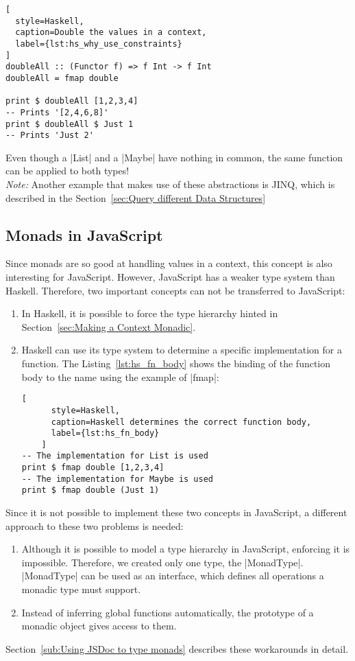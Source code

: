 \begin{lstlisting}[
  style=Haskell,
  caption=Double the values in a context,
  label={lst:hs_why_use_constraints}
]
doubleAll :: (Functor f) => f Int -> f Int
doubleAll = fmap double

print $ doubleAll [1,2,3,4]
-- Prints '[2,4,6,8]'
print $ doubleAll $ Just 1
-- Prints 'Just 2'
\end{lstlisting}

Even though a |List| and a |Maybe| have nothing in common, the same function
can be applied to both types! \\ 
\textit{Note:} Another example that makes use of these abstractions is JINQ,
which is described in the Section~\ref{sec:Query different Data Structures}


\subsection{Monads in JavaScript} %
\label{sub:Monads in JavaScript}
Since monads are so good at handling values in a context, this concept is also
interesting for JavaScript. However, JavaScript has a weaker type system than
Haskell. Therefore, two important concepts can not be transferred to
JavaScript: 
\begin{enumerate}
  \item In Haskell, it is possible to force the type hierarchy hinted in
    Section~\ref{sec:Making a Context Monadic}.
  \item Haskell can use its type system to determine a specific implementation
    for a function. The Listing~\ref{lst:hs_fn_body} shows the binding of the
    function body to the name using the example of |fmap|:
    \begin{lstlisting}[
      style=Haskell,
      caption=Haskell determines the correct function body,
      label={lst:hs_fn_body}
    ]
-- The implementation for List is used
print $ fmap double [1,2,3,4]
-- The implementation for Maybe is used
print $ fmap double (Just 1)
    \end{lstlisting}
\end{enumerate}


Since it is not possible to implement these two concepts in JavaScript, a
different approach to these two problems is needed:
\begin{enumerate}
  \item Although it is possible to model a type hierarchy in JavaScript,
    enforcing it is impossible. Therefore, we created only one type, the
    |MonadType|. |MonadType| can be used as an interface, which defines all
    operations a monadic type must support.  
  \item Instead of inferring global functions automatically, the prototype of a
    monadic object gives access to them. \cite{mdn_prototype_2023}
\end{enumerate}
Section~\ref{sub:Using JSDoc to type monads} describes these workarounds in
detail.

